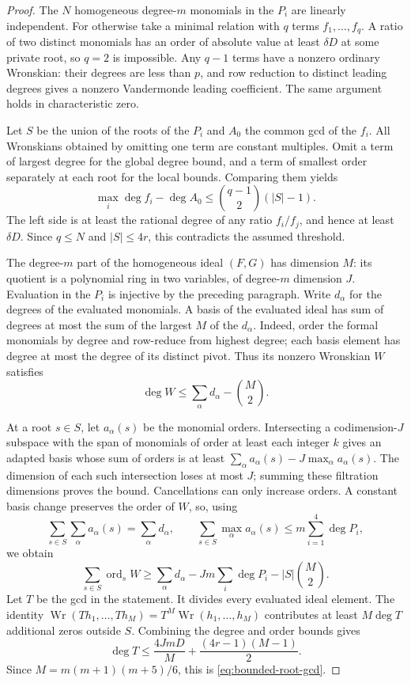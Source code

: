 \begin{proof}
The $N$ homogeneous degree-$m$ monomials in the $P_i$ are linearly
independent. For otherwise take a minimal relation with $q$ terms
$f_1,\ldots,f_q$. A ratio of two distinct monomials has an order of
absolute value at least $\delta D$ at some private root, so $q=2$
is impossible. Any $q-1$ terms have a nonzero ordinary Wronskian:
their degrees are less than $p$, and row reduction to distinct leading
degrees gives a nonzero Vandermonde leading coefficient. The same
argument holds in characteristic zero.

Let $S$ be the union of the roots of the $P_i$ and $A_0$ the common
gcd of the $f_i$. All Wronskians obtained by omitting one term are
constant multiples. Omit a term of largest degree for the global
degree bound, and a term of smallest order separately at each root for
the local bounds. Comparing them yields
\[
 \max_i\deg f_i-\deg A_0\le\binom{q-1}{2}(|S|-1).
\]
The left side is at least the rational degree of any ratio $f_i/f_j$,
and hence at least $\delta D$. Since $q\le N$ and $|S|\le4r$,
this contradicts the assumed threshold.

The degree-$m$ part of the homogeneous ideal $(F,G)$ has dimension
$M$: its quotient is a polynomial ring in two variables, of degree-$m$
dimension $J$. Evaluation in the $P_i$ is injective by the preceding
paragraph. Write $d_\alpha$ for the degrees of the evaluated monomials.
A basis of the evaluated ideal has sum of degrees at most the sum of
the largest $M$ of the $d_\alpha$. Indeed, order the formal monomials
by degree and row-reduce from highest degree; each basis element has
degree at most the degree of its distinct pivot. Thus its nonzero
Wronskian $W$ satisfies
\[
 \deg W\le\sum_\alpha d_\alpha-\binom M2.
\]

At a root $s\in S$, let $a_\alpha(s)$ be the monomial orders.
Intersecting a codimension-$J$ subspace with the span of monomials
of order at least each integer $k$ gives an adapted basis whose sum of
orders is at least
$\sum_\alpha a_\alpha(s)-J\max_\alpha a_\alpha(s)$.
The dimension of each such intersection loses at most $J$;
summing these filtration dimensions proves the bound. Cancellations
can only increase orders. A constant basis change preserves the order
of $W$, so, using
\[
 \sum_{s\in S}\sum_\alpha a_\alpha(s)=\sum_\alpha d_\alpha,
 \qquad
 \sum_{s\in S}\max_\alpha a_\alpha(s)
 \le m\sum_{i=1}^4\deg P_i,
\]
we obtain
\[
 \sum_{s\in S}\operatorname{ord}_s W
 \ge\sum_\alpha d_\alpha-Jm\sum_i\deg P_i-|S|\binom M2.
\]
Let $T$ be the gcd in the statement. It divides every evaluated ideal
element. The identity
$\operatorname{Wr}(Th_1,\ldots,Th_M)=T^M\operatorname{Wr}(h_1,\ldots,h_M)$
contributes at least $M\deg T$ additional zeros outside $S$.
Combining the degree and order bounds gives
\[
 \deg T\le\frac{4JmD}{M}+\frac{(4r-1)(M-1)}2.
\]
Since $M=m(m+1)(m+5)/6$, this is \eqref{eq:bounded-root-gcd}.
\end{proof}

